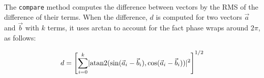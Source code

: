 The \lstinline{compare} method computes the difference between vectors by the RMS of the difference of their terms. When the difference, \(d\) is computed for two vectors \(\vec{a}\) and \(\vec{b}\) with \(k\) terms, it uses arctan to account for the fact phase wraps around \(2\pi\), as follows:

\begin{equation}
  d = \left[ \sum_{i=0}^{k}\lvert\operatorname{atan2}(\sin(\vec{a}_i - \vec{b}_i), \cos(\vec{a}_i - \vec{b}_i))\rvert^2 \right]^{1/2}
\end{equation}

